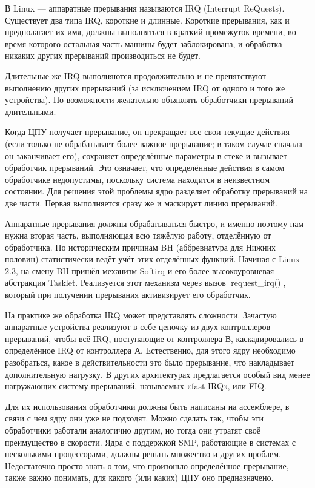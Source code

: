 \documentclass[10pt, oneside]{book}
\begin{document}
В Linux — аппаратные прерывания называются IRQ (Interrupt ReQuests). Существует два типа IRQ, короткие и длинные. Короткие прерывания, как и предполагает их имя, должны выполняться в краткий промежуток времени, во время которого остальная часть машины будет заблокирована, и обработка никаких других прерываний производиться не будет.

Длительные же IRQ выполняются продолжительно и не препятствуют выполнению других прерываний (за исключением IRQ от одного и того же устройства). По возможности желательно объявлять обработчики прерываний длительными.

Когда ЦПУ получает прерывание, он прекращает все свои текущие действия (если только
не обрабатывает более важное прерывание; в таком случае сначала он заканчивает его), сохраняет определённые параметры в стеке и вызывает обработчик прерываний. Это означает, что определённые действия в самом обработчике недопустимы, поскольку система находится в неизвестном состоянии. Для решения этой проблемы ядро разделяет обработку прерываний на две части. Первая выполняется сразу же и маскирует линию прерываний.

Аппаратные прерывания должны обрабатываться быстро, и именно поэтому нам нужна вторая часть, выполняющая всю тяжёлую работу, отделённую от обработчика. По
историческим причинам BH (аббревиатура для Нижних половин) статистически ведёт учёт этих отделённых функций. Начиная с Linux 2.3, на смену BH пришёл механизм Softirq и его более высокоуровневая абстракция Tasklet. Реализуется этот механизм через вызов \cpp|request_irq()|, который при получении
прерывания активизирует его обработчик.

На практике же обработка IRQ может представлять сложности. Зачастую аппаратные устройства реализуют в себе цепочку из двух контроллеров прерываний, чтобы всё IRQ, поступающие от контроллера В, каскадировались в определённое IRQ от контроллера А. Естественно, для этого ядру необходимо разобраться, какое в действительности это было прерывание, что накладывает дополнительную нагрузку. В других архитектурах предлагается особый вид менее нагружающих систему прерываний, называемых «fast IRQ», или FIQ.

Для их использования обработчики должны быть написаны на ассемблере, в связи с чем ядру они уже не подходят. Можно сделать так, чтобы эти обработчики работали аналогично другим, но тогда они утратят своё преимущество в скорости. Ядра с поддержкой SMP, работающие в системах с несколькими процессорами, должны решать множество и других проблем. Недостаточно просто знать о том, что произошло определённое прерывание, также важно понимать, для какого (или каких) ЦПУ оно предназначено.
\end{document}
